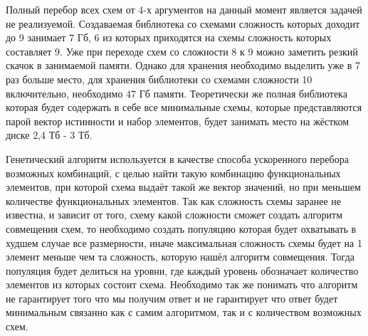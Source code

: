 \documentclass[14pt]{extarticle} %
\begin{document}
Полный перебор всех схем от 4-х аргументов на данный момент является задачей не реализуемой. Создаваемая библиотека со схемами сложность которых доходит до 9 занимает 7 Гб, 6 из которых приходятся на схемы сложность которых составляет 9. Уже при переходе схем со сложности 8 к 9 можно заметить резкий скачок в занимаемой памяти. Однако для хранения необходимо выделить уже в 7 раз больше место, для хранения библиотеки со схемами сложности 10 включительно, необходимо 47 Гб памяти. Теоретически же полная библиотека которая будет содержать в себе все минимальные схемы, которые представляются парой вектор истинности и набор элементов, будет занимать место на жёстком диске 2,4 Тб - 3 Тб.
















Генетический алгоритм используется в качестве способа ускоренного перебора возможных комбинаций, с целью найти такую комбинацию функциональных элементов, при которой схема выдаёт такой же вектор значений, но при меньшем количестве функциональных элементов. Так как сложность схемы заранее не известна, и зависит от того, схему какой сложности сможет создать алгоритм совмещения схем, то необходимо создать популяцию которая будет охватывать в худшем случае все размерности, иначе максимальная сложность схемы будет на 1 элемент меньше чем та сложность, которую нашёл алгоритм совмещения. Тогда популяция будет делиться на уровни, где каждый уровень обозначает количество элементов из которых состоит схема. Необходимо так же понимать что алгоритм не гарантирует того что мы получим ответ и не гарантирует что ответ будет минимальным связанно как с самим алгоритмом, так и с количеством возможных схем.
\end{document}
